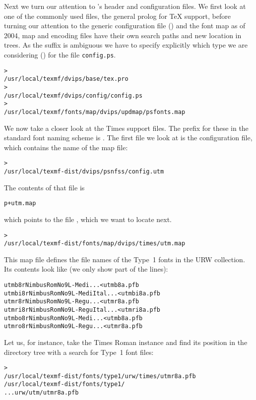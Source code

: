 \documentclass{article}
\begin{document}
Next we turn our attention to 's header and configuration
files.  We first look at one of the commonly used files, the general
prolog  for \TeX{} support, before turning our attention
to the generic configuration file () and the \PS{} font
map \Dash as of 2004, map and encoding files have
their own search paths and new location in  trees.  As
the  suffix is ambiguous we have to specify explicitly which
type we are considering () for the file
\texttt{config.ps}.
\begin{alltt}
> 
   /usr/local/texmf/dvips/base/tex.pro
> 
   /usr/local/texmf/dvips/config/config.ps
> 
   /usr/local/texmf/fonts/map/dvips/updmap/psfonts.map
\end{alltt}

We now take a closer look at the  Times \PS{} support
files.  The prefix for these in the standard font naming scheme is
.  The first file we look at is the configuration file,
which contains the name of the map file:
\begin{alltt}
> 
   /usr/local/texmf-dist/dvips/psnfss/config.utm
\end{alltt}
The contents of that file is
\begin{alltt}
  p +utm.map
\end{alltt}
which points to the file , which we want to
locate next.
\begin{alltt}
> 
   /usr/local/texmf-dist/fonts/map/dvips/times/utm.map
\end{alltt}
This map file defines the file names of the Type~1 \PS{} fonts in
the URW collection.  Its contents look like (we only show part of the
lines):
\begin{alltt}
utmb8r  NimbusRomNo9L-Medi    ... <utmb8a.pfb
utmbi8r NimbusRomNo9L-MediItal... <utmbi8a.pfb
utmr8r  NimbusRomNo9L-Regu    ... <utmr8a.pfb
utmri8r NimbusRomNo9L-ReguItal... <utmri8a.pfb
utmbo8r NimbusRomNo9L-Medi    ... <utmb8a.pfb
utmro8r NimbusRomNo9L-Regu    ... <utmr8a.pfb
\end{alltt}
Let us, for instance, take the Times Roman instance
 and find its position in the  directory
tree with a search for Type~1 font files:
\begin{alltt}
> 
\ifSingleColumn   /usr/local/texmf-dist/fonts/type1/urw/times/utmr8a.pfb
\else   /usr/local/texmf-dist/fonts/type1/
... urw/utm/utmr8a.pfb
\fi\end{alltt}
\end{document}
